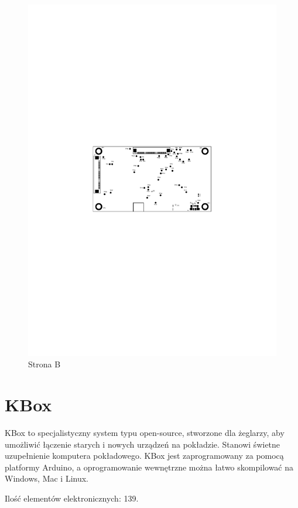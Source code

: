 \begin{figure}[!htb]
\begin{minipage}{0.5\textwidth}
		\includegraphics[width=0.95\linewidth,clip, trim=5.5cm 12cm 5.5cm 11cm]{./chapters/chapter5/Jetson_B.pdf}
		\caption{Strona B}\label{chilli:StronaB}
	\end{minipage}
\end{figure}

\section{KBox}
KBox to specjalistyczny system typu open-source, stworzone dla żeglarzy, aby umożliwić łączenie starych i nowych urządzeń na pokładzie. Stanowi świetne uzupełnienie komputera pokładowego. KBox jest zaprogramowany za pomocą platformy Arduino, a oprogramowanie wewnętrzne można łatwo skompilować na Windows, Mac i Linux.

\breakparagraph{}
Ilość elementów elektronicznych: 139.


